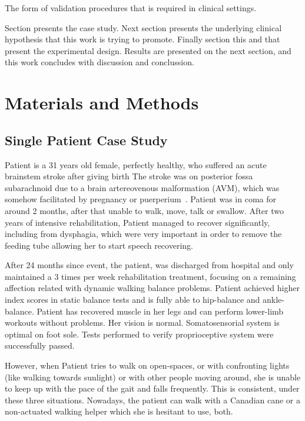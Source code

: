 \documentclass[conference]{IEEEtran}
\begin{document}
The form of validation procedures that is required in clinical settings\cite{Papastylianou.etal2016}.

Section presents the case study.  Next section presents the underlying clinical hypothesis that this work is trying to promote.  Finally section this and that present the experimental design.  Results are presented on the next section, and this work concludes with discussion and conclussion.

\section{Materials and Methods}

\subsection{Single Patient Case Study}

Patient is a 31 years old female, perfectly healthy, who suffered an acute brainstem stroke after giving birth  The stroke was on posterior fossa subarachnoid due to a brain artereovenous malformation (AVM), which was somehow facilitated by pregnancy or puerperium~\cite{Porras.etal2017}.  Patient was in coma for around 2 months, after that unable to walk, move, talk or swallow.  After two years of intensive rehabilitation, Patient managed to recover significantly, including from dysphagia, which were very important in order to remove the feeding tube allowing her to start speech recovering.  

After 24 months since event, the patient, was discharged from hospital and only maintained a 3 times per week rehabilitation treatment, focusing on a remaining affection related with dynamic walking balance problems.  Patient achieved higher index scores in static balance tests and is fully able to hip-balance and ankle-balance.  Patient has recovered muscle in her legs and can perform lower-limb workouts without problems.  Her vision is normal.  Somatosensorial system is optimal on foot sole.  Tests performed to verify proprioceptive system were successfully passed.

However, when Patient tries to walk on open-spaces, or with confronting lights (like walking towards sunlight) or with other people moving around, she is unable to keep up with the pace of the gait and falls frequently.  This is consistent, under these three situations.  Nowadays, the patient can walk with a Canadian cane or a non-actuated walking helper which she is hesitant to use, both.
\end{document}

